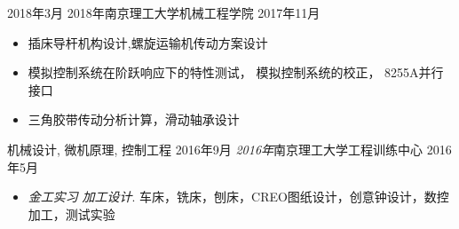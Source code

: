 \begin{experiences}
%	
%
%  	
  \experience
  {2018年3月} {2018年}{南京理工大学}{机械工程学院}
  {2017年11月} {
				  	\begin{itemize}
				  		\item  插床导杆机构设计,螺旋运输机传动方案设计
				  		\item  模拟控制系统在阶跃响应下的特性测试，  模拟控制系统的校正， 8255A并行接口
				  		\item 三角胶带传动分析计算，滑动轴承设计 
				  	\end{itemize}
				  }
				  {机械设计, 微机原理, 控制工程} 				  
  \emptySeparator
  \experience
  {2016年9月} {\emph{2016年}}{南京理工大学}{工程训练中心}
  {2016年5月}     {
				  	\begin{itemize}
				  		\item \emph{金工实习} \emph{加工设计}.  
				  		车床，铣床，刨床，CREO图纸设计，创意钟设计，数控加工，测试实验

\end{itemize}}
\end{experiences}
